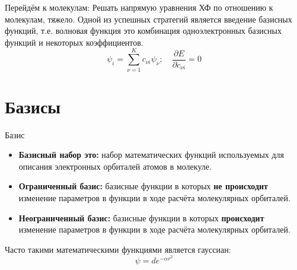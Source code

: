 \begin{frame}{Перейдём к молекулам:}
        Решать напрямую уравнения ХФ по отношению к молекулам, тяжело. Одной из успешных стратегий является
        введение базисных функций, т.е. волновая функция это комбинация одноэлектронных базисных функций и некоторых
        коэффициентов. \\
        \[ \psi_i =\sum _{\nu=1}^{K}c_{\nu i}\psi_\nu ; \quad \frac{\partial E}{\partial c_{\nu i}} =0 
         \]
     \end{frame}


\section{Базисы}


\begin{frame}{Базис}
    \begin{itemize}
        \item \textbf{Базисный набор это:} набор математических функций используемых для описания электронных орбиталей атомов в молекуле. 
        \item \textbf{Ограниченный базис:} базисные функции в которых \textbf{не происходит} изменение параметров в функции в ходе расчёта  молекулярных орбиталей.
        \item  \textbf{Неограниченный базис:} базисные функции в которых  \textbf{происходит} изменение параметров в функции в ходе расчёта
    молекулярных орбиталей.
    \end{itemize}
    Часто такими математическими функциями является гауссиан:
    \[ \psi = d e^{-\alpha r^2} \]
\end{frame}

